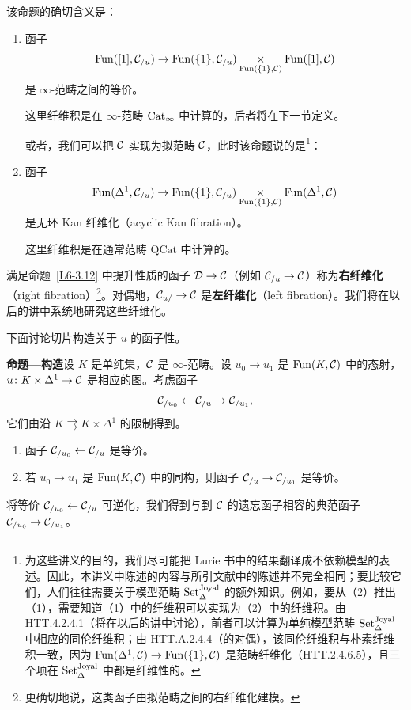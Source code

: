 \begin{remark}\label{L6-3.13}
该命题的确切含义是：
\begin{enumerate}[label=(\arabic*),leftmargin=2.4em,itemsep=0.1em]
\item 函子
\[
\operatorname{Fun}([1],\mathcal{C}_{/u})\to\operatorname{Fun}(\{1\},\mathcal{C}_{/u})\underset{\operatorname{Fun}(\{1\},\mathcal{C})}{\times}\operatorname{Fun}([1],\mathcal{C})
\]
是 $\infty$-范畴之间的等价。

这里纤维积是在 $\infty$-范畴 $\operatorname{Cat}_\infty$ 中计算的，后者将在下一节定义。

或者，我们可以把 $\mathcal{C}$ 实现为拟范畴 $\mathcal{C}$，此时该命题说的是\footnote{为这些讲义的目的，我们尽可能把 Lurie 书中的结果翻译成不依赖模型的表述。因此，本讲义中陈述的内容与所引文献中的陈述并不完全相同；要比较它们，人们往往需要关于模型范畴 $\operatorname{Set}^{\mathrm{Joyal}}_{\Delta}$ 的额外知识。例如，要从（2）推出（1），需要知道（1）中的纤维积可以实现为（2）中的纤维积。由 HTT.4.2.4.1（将在以后的讲中讨论），前者可以计算为单纯模型范畴 $\operatorname{Set}^{\mathrm{Joyal}}_{\Delta}$ 中相应的同伦纤维积；由 HTT.A.2.4.4（的对偶），该同伦纤维积与朴素纤维积一致，因为 $\operatorname{Fun}(\Delta^1,\mathcal{C})\to\operatorname{Fun}(\{1\},\mathcal{C})$ 是范畴纤维化（HTT.2.4.6.5），且三个项在 $\operatorname{Set}^{\mathrm{Joyal}}_{\Delta}$ 中都是纤维性的。}\label{fn:L6-4}：
\item 函子
\[
\operatorname{Fun}(\Delta^1,\mathcal{C}_{/u})\to\operatorname{Fun}(\{1\},\mathcal{C}_{/u})\underset{\operatorname{Fun}(\{1\},\mathcal{C})}{\times}\operatorname{Fun}(\Delta^1,\mathcal{C})
\]
是无环 Kan 纤维化（acyclic Kan fibration）。

这里纤维积是在通常范畴 $\mathrm{QCat}$ 中计算的。
\end{enumerate}
满足命题~\ref{L6-3.12} 中提升性质的函子 $\mathcal{D}\to\mathcal{C}$（例如 $\mathcal{C}_{/u}\to\mathcal{C}$）称为\textbf{右纤维化}（right fibration）\footnote{更确切地说，这类函子由拟范畴之间的右纤维化建模。}。对偶地，$\mathcal{C}_{u/}\to\mathcal{C}$ 是\textbf{左纤维化}（left fibration）。我们将在以后的讲中系统地研究这些纤维化。
\end{remark}

\nitem\label{L6-3.14} 下面讨论切片构造关于 $u$ 的函子性。

\nitem\label{L6-3.15}\textbf{命题—构造}\quad 设 $K$ 是单纯集，$\mathcal{C}$ 是 $\infty$-范畴。设 $u_0\to u_1$ 是 $\operatorname{Fun}(K,\mathcal{C})$ 中的态射，$u\colon K\times\Delta^1\to\mathcal{C}$ 是相应的图。考虑函子
\[
\mathcal{C}_{/u_0}\leftarrow\mathcal{C}_{/u}\to\mathcal{C}_{/u_1},
\]
它们由沿 $K\rightrightarrows K\times\Delta^1$ 的限制得到。
\begin{enumerate}[label=(\arabic*),leftmargin=2.4em,itemsep=0.1em]
\item 函子 $\mathcal{C}_{/u_0}\leftarrow\mathcal{C}_{/u}$ 是等价。
\item 若 $u_0\to u_1$ 是 $\operatorname{Fun}(K,\mathcal{C})$ 中的同构，则函子 $\mathcal{C}_{/u}\to\mathcal{C}_{/u_1}$ 是等价。
\end{enumerate}
将等价 $\mathcal{C}_{/u_0}\leftarrow\mathcal{C}_{/u}$ 可逆化，我们得到与到 $\mathcal{C}$ 的遗忘函子相容的典范函子 $\mathcal{C}_{/u_0}\to\mathcal{C}_{/u_1}$。

